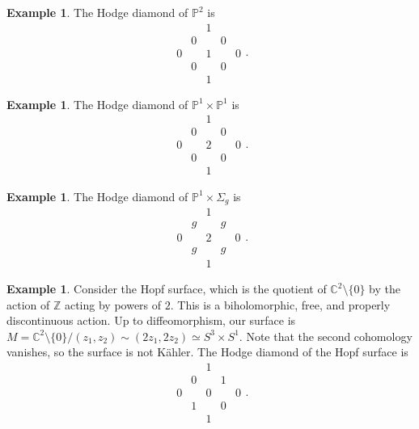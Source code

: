 \documentclass[leqno, openany]{memoir}
\theoremstyle{definition}
\newtheorem{exm}[thm]{Example}
\theoremstyle{remark}
\theoremstyle{plain}
\theoremstyle{definition}
\theoremstyle{remark}
\renewcommand{\C}{\mathbb{C}}
\newcommand{\Z}{\mathbb{Z}}
\renewcommand{\P}{\mathbb{P}}
\begin{document}
\begin{exm}
    The Hodge diamond of $\P^2$ is 
    \[ \begin{array}{ccccc}
         & & 1 & & \\
         & 0 & & 0 & \\
        0 & & 1 & & 0 \\
          & 0 & & 0 & \\
          & & 1 & & 
    \end{array}.\]
\end{exm}

\begin{exm}
    The Hodge diamond of $\P^1 \times \P^1$ is 
    \[ \begin{array}{ccccc}
         & & 1 & & \\
         & 0 & & 0 & \\
        0 & & 2 & & 0 \\
          & 0 & & 0 & \\
          & & 1 & & 
    \end{array}.\]
\end{exm}

\begin{exm}
    The Hodge diamond of $\P^1 \times \Sigma_g$ is
    \[ \begin{array}{ccccc}
         & & 1 & & \\
         & g & & g & \\
        0 & & 2 & & 0 \\
          & g & & g & \\
          & & 1 & & 
    \end{array}.\]
\end{exm}

\begin{exm}
    Consider the Hopf surface, which is the quotient of $\C^2 \setminus \{0\}$ by the action of $\Z$ acting by powers of $2$. This is a biholomorphic, free, and properly discontinuous action. Up to diffeomorphism, our surface is $M = \C^2 \setminus \{0\} / (z_1,z_2) \sim (2z_1, 2z_2) \simeq S^3 \times S^1$. Note that the second cohomology vanishes, so the surface is not K\"ahler. The Hodge diamond of the Hopf surface is
    \[ \begin{array}{ccccc}
         & & 1 & & \\
         & 0 & & 1 & \\
        0 & & 0 & & 0 \\
          & 1 & & 0 & \\
          & & 1 & & 
    \end{array}.\]
\end{exm}
\end{document}
